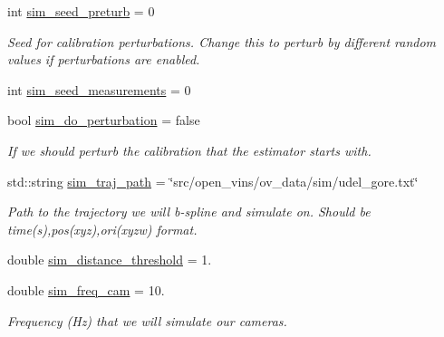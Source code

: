 \begin{DoxyCompactItemize}
int \hyperlink{structov__msckf_1_1VioManagerOptions_afe2c433c61d25c18901b089a2215114c}{sim\+\_\+seed\+\_\+preturb} = 0
\begin{DoxyCompactList}\small\item\em Seed for calibration perturbations. Change this to perturb by different random values if perturbations are enabled. \end{DoxyCompactList}\item 
int \hyperlink{structov__msckf_1_1VioManagerOptions_a9b3fee122a7d3b2069a424b5ef1b1155}{sim\+\_\+seed\+\_\+measurements} = 0
\item 
\mbox{\label{structov__msckf_1_1VioManagerOptions_a4d595d5277582b53d12ad75bc7a6ad57}} 
bool \hyperlink{structov__msckf_1_1VioManagerOptions_a4d595d5277582b53d12ad75bc7a6ad57}{sim\+\_\+do\+\_\+perturbation} = false
\begin{DoxyCompactList}\small\item\em If we should perturb the calibration that the estimator starts with. \end{DoxyCompactList}\item 
\mbox{\label{structov__msckf_1_1VioManagerOptions_ab948eee26f7031d626297b172c9d183d}} 
std\+::string \hyperlink{structov__msckf_1_1VioManagerOptions_ab948eee26f7031d626297b172c9d183d}{sim\+\_\+traj\+\_\+path} = \char`\"{}src/open\+\_\+vins/ov\+\_\+data/sim/udel\+\_\+gore.\+txt\char`\"{}
\begin{DoxyCompactList}\small\item\em Path to the trajectory we will b-\/spline and simulate on. Should be time(s),pos(xyz),ori(xyzw) format. \end{DoxyCompactList}\item 
double \hyperlink{structov__msckf_1_1VioManagerOptions_a3b6af0048e6bb9b903088f30f9be7221}{sim\+\_\+distance\+\_\+threshold} = 1.
\item 
\mbox{\label{structov__msckf_1_1VioManagerOptions_a093cc163f266b0c013d7eda528bb1e80}} 
double \hyperlink{structov__msckf_1_1VioManagerOptions_a093cc163f266b0c013d7eda528bb1e80}{sim\+\_\+freq\+\_\+cam} = 10.
\begin{DoxyCompactList}\small\item\em Frequency (Hz) that we will simulate our cameras. \end{DoxyCompactList}\item 

\end{DoxyCompactItemize}
